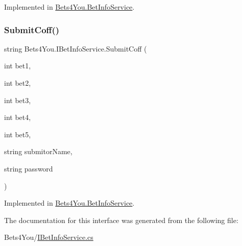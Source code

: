 Implemented in \mbox{\hyperlink{class_bets4_you_1_1_bet_info_service_aedba79801c5395db599f761241964617}{Bets4\+You.\+Bet\+Info\+Service}}.

\mbox{\label{interface_bets4_you_1_1_i_bet_info_service_a7f2edf98f56407ad890acfb5c4b839e3}} 
\subsubsection{\texorpdfstring{SubmitCoff()}{SubmitCoff()}}
{\footnotesize\ttfamily string Bets4\+You.\+I\+Bet\+Info\+Service.\+Submit\+Coff (\begin{DoxyParamCaption}\item[{int}]{bet1,  }\item[{int}]{bet2,  }\item[{int}]{bet3,  }\item[{int}]{bet4,  }\item[{int}]{bet5,  }\item[{string}]{submitor\+Name,  }\item[{string}]{password }\end{DoxyParamCaption})}



Implemented in \mbox{\hyperlink{class_bets4_you_1_1_bet_info_service_a743f5c2955670ff7965a5bebce053be9}{Bets4\+You.\+Bet\+Info\+Service}}.



The documentation for this interface was generated from the following file\+:\begin{DoxyCompactItemize}
\item 
Bets4\+You/\mbox{\hyperlink{_i_bet_info_service_8cs}{I\+Bet\+Info\+Service.\+cs}}\end{DoxyCompactItemize}
